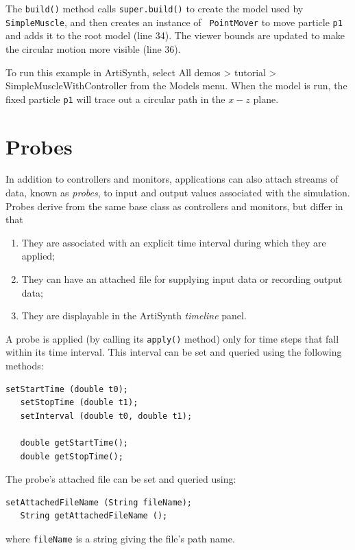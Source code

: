 The {\tt build()} method calls {\tt super.build()} to create the model
used by {\tt SimpleMuscle}, and then creates an instance of {\tt
PointMover} to move particle {\tt p1} and adds it to the root model
(line 34). The viewer bounds are updated to make the circular motion
more visible (line 36).

To run this example in ArtiSynth, select {\sf All demos > tutorial >
SimpleMuscleWithController} from the {\sf Models} menu. When
the model is run, the fixed particle {\tt p1} will trace
out a circular path in the $x-z$ plane.

\section{Probes}
\label{Probes:sec}

In addition to controllers and monitors, applications can also attach
streams of data, known as {\it probes}, to input and output values
associated with the simulation. Probes derive from the same base class
 as 
controllers and monitors, 
but differ in that 

\begin{enumerate}

\item They are associated with an explicit time interval during which
they are applied;

\item They can have an attached file for supplying input data or
recording output data;

\item They are displayable in the ArtiSynth {\it timeline} panel.

\end{enumerate}

A probe is applied (by calling its {\tt apply()} method) only for time
steps that fall within its time interval. This interval can be set and
queried using the following methods:
%
\begin{lstlisting}[]
   setStartTime (double t0);
   setStopTime (double t1);
   setInterval (double t0, double t1);
 
   double getStartTime();
   double getStopTime();
\end{lstlisting}
%
The probe's attached file can be set and queried using:
%
\begin{lstlisting}[]
   setAttachedFileName (String fileName);
   String getAttachedFileName ();
\end{lstlisting}
%
where {\tt fileName} is a string giving the file's path name.


